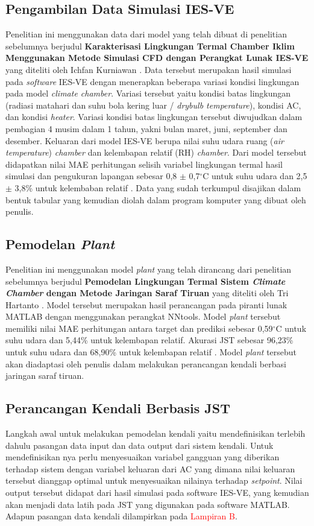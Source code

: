 \subsection{Pengambilan Data Simulasi IES-VE}
Penelitian ini menggunakan data dari model yang telah dibuat di penelitian sebelumnya berjudul \textbf{Karakterisasi Lingkungan Termal Chamber Iklim Menggunakan Metode Simulasi CFD dengan Perangkat Lunak IES-VE} yang diteliti oleh Ichfan Kurniawan \cite{skripsiIchfan}.  Data tersebut merupakan hasil simulasi pada \textit{software} IES-VE dengan menerapkan beberapa variasi kondisi lingkungan pada model \textit{climate chamber}. Variasi tersebut yaitu kondisi batas lingkungan (radiasi matahari dan suhu bola kering luar / \textit{drybulb temperature}), kondisi AC, dan kondisi \textit{heater}. Variasi kondisi batas lingkungan tersebut diwujudkan dalam pembagian 4 musim dalam 1 tahun, yakni bulan maret, juni, september dan desember. Keluaran dari model IES-VE berupa nilai suhu udara ruang (\textit{air temperature}) \textit{chamber} dan kelembapan relatif (RH) \textit{chamber}. Dari model tersebut didapatkan nilai MAE perhitungan selisih variabel lingkungan termal hasil simulasi dan pengukuran lapangan sebesar 0,8 $\pm$ 0,7$^{\circ}$C untuk suhu udara dan 2,5 $\pm$ 3,8\% untuk kelembaban relatif \cite{skripsiIchfan}. Data yang sudah terkumpul disajikan dalam bentuk tabular yang kemudian diolah dalam program komputer yang dibuat oleh penulis.

\subsection{Pemodelan \textit{Plant}}
Penelitian ini menggunakan model \textit{plant} yang telah dirancang dari penelitian sebelumnya berjudul \textbf{Pemodelan Lingkungan Termal Sistem \textit{Climate Chamber} dengan Metode Jaringan Saraf Tiruan} yang diteliti oleh Tri Hartanto \cite{skripsiTanto}. Model tersebut merupakan hasil perancangan pada piranti lunak MATLAB dengan menggunakan perangkat NNtools. Model \textit{plant} tersebut memiliki nilai MAE perhitungan antara target dan prediksi sebesar 0,59$^{\circ}$C untuk suhu udara dan 5,44\% untuk kelembapan relatif. Akurasi JST sebesar 96,23\% untuk suhu udara dan 68,90\% untuk kelembapan relatif \cite{skripsiTanto}. Model \textit{plant} tersebut akan diadaptasi oleh penulis dalam melakukan perancangan kendali berbasi jaringan saraf tiruan.

\subsection{Perancangan Kendali Berbasis JST}
Langkah awal untuk melakukan pemodelan kendali yaitu mendefinisikan terlebih dahulu pasangan data input dan data output dari sistem kendali. Untuk mendefinisikan nya perlu menyesuaikan variabel gangguan yang diberikan terhadap sistem dengan variabel keluaran dari AC yang dimana nilai keluaran tersebut dianggap optimal untuk menyesuaikan nilainya terhadap \textit{setpoint}. Nilai output tersebut didapat dari hasil simulasi pada software IES-VE, yang kemudian akan menjadi data latih pada JST yang digunakan pada software MATLAB. Adapun pasangan data kendali dilampirkan pada \textcolor{red}{Lampiran B}.

